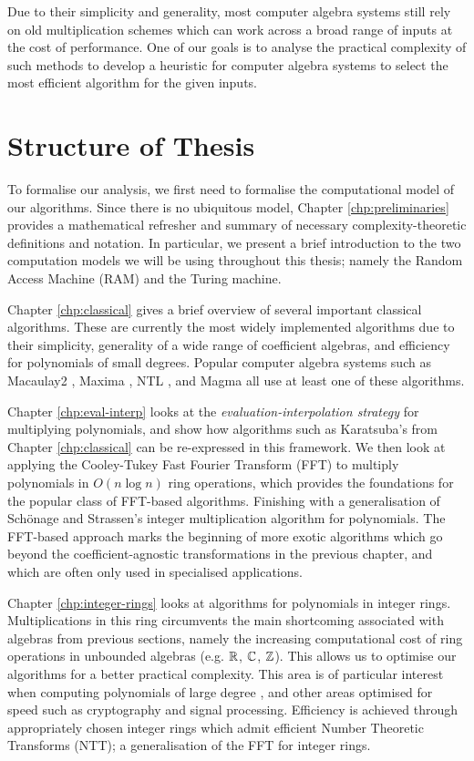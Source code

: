 Due to their simplicity and generality, most computer algebra systems still rely on old multiplication schemes which can work across a broad range of inputs at the cost of performance. One of our goals is to analyse the practical complexity of such methods to develop a heuristic for computer algebra systems to select the most efficient algorithm for the given inputs.

\section{Structure of Thesis}
\label{sec:Structure-of-Thesis}

To formalise our analysis, we first need to formalise the computational model of our algorithms. Since there is no ubiquitous model, Chapter \ref{chp:preliminaries} provides a mathematical refresher and summary of necessary complexity-theoretic definitions and notation. In particular, we present a brief introduction to the two computation models we will be using throughout this thesis; namely the Random Access Machine (RAM) and the Turing machine.

Chapter \ref{chp:classical} gives a brief overview of several important classical algorithms. These are currently the most widely implemented algorithms due to their simplicity, generality of a wide range of coefficient algebras, and efficiency for polynomials of small degrees. Popular computer algebra systems such as Macaulay2 \cite{macaulay2-polynomial}, Maxima \cite{maxima-karatsuba}, NTL \cite{ntl}, and Magma \cite{magma} all use at least one of these algorithms.

Chapter \ref{chp:eval-interp} looks at the \emph{evaluation-interpolation strategy} for multiplying polynomials, and show how algorithms such as Karatsuba's from Chapter \ref{chp:classical} can be re-expressed in this framework. We then look at applying the Cooley-Tukey Fast Fourier Transform (FFT) to multiply polynomials in $O(n \log n)$ ring operations, which provides the foundations for the popular class of FFT-based algorithms. Finishing with a generalisation of Sch\"{o}nage and Strassen's integer multiplication algorithm for polynomials. The FFT-based approach marks the beginning of more exotic algorithms which go beyond the coefficient-agnostic transformations in the previous chapter, and which are often only used in specialised applications.

Chapter \ref{chp:integer-rings} looks at algorithms for polynomials in integer rings. Multiplications in this ring circumvents the main shortcoming associated with algebras from previous sections, namely the increasing computational cost of ring operations in unbounded algebras (e.g. ${\mathbb R}$, ${\mathbb C}$, ${\mathbb Z}$). This allows us to optimise our algorithms for a better practical complexity. This area is of particular interest when computing polynomials of large degree \cite{crt-parallel-mul}\cite{crt-mul-gpu}, and other areas optimised for speed such as cryptography and signal processing. Efficiency is achieved through appropriately chosen integer rings which admit efficient Number Theoretic Transforms (NTT); a generalisation of the FFT for integer rings.

